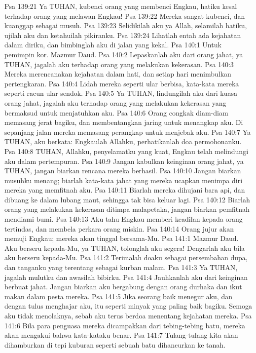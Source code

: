 Psa 139:21  Ya TUHAN, kubenci orang yang membenci Engkau, hatiku kesal terhadap orang yang melawan Engkau!
Psa 139:22  Mereka sangat kubenci, dan kuanggap sebagai musuh.
Psa 139:23  Selidikilah aku ya Allah, selamilah hatiku, ujilah aku dan ketahuilah pikiranku.
Psa 139:24  Lihatlah entah ada kejahatan dalam diriku, dan bimbinglah aku di jalan yang kekal.
Psa 140:1  Untuk pemimpin kor. Mazmur Daud.
Psa 140:2  Lepaskanlah aku dari orang jahat, ya TUHAN, jagalah aku terhadap orang yang melakukan kekerasan.
Psa 140:3  Mereka merencanakan kejahatan dalam hati, dan setiap hari menimbulkan pertengkaran.
Psa 140:4  Lidah mereka seperti ular berbisa, kata-kata mereka seperti racun ular sendok.
Psa 140:5  Ya TUHAN, lindungilah aku dari kuasa orang jahat, jagalah aku terhadap orang yang melakukan kekerasan yang bermaksud untuk menjatuhkan aku.
Psa 140:6  Orang congkak diam-diam memasang jerat bagiku, dan membentangkan jaring untuk menangkap aku. Di sepanjang jalan mereka memasang perangkap untuk menjebak aku.
Psa 140:7  Ya TUHAN, aku berkata: Engkaulah Allahku, perhatikanlah doa permohonanku.
Psa 140:8  TUHAN, Allahku, penyelamatku yang kuat, Engkau telah melindungi aku dalam pertempuran.
Psa 140:9  Jangan kabulkan keinginan orang jahat, ya TUHAN, jangan biarkan rencana mereka berhasil.
Psa 140:10  Jangan biarkan musuhku menang; biarlah kata-kata jahat yang mereka ucapkan menimpa diri mereka yang memfitnah aku.
Psa 140:11  Biarlah mereka dihujani bara api, dan dibuang ke dalam lubang maut, sehingga tak bisa keluar lagi.
Psa 140:12  Biarlah orang yang melakukan kekerasan ditimpa malapetaka, jangan biarkan pemfitnah mendiami bumi.
Psa 140:13  Aku tahu Engkau memberi keadilan kepada orang tertindas, dan membela perkara orang miskin.
Psa 140:14  Orang jujur akan memuji Engkau; mereka akan tinggal bersama-Mu.
Psa 141:1  Mazmur Daud. Aku berseru kepada-Mu, ya TUHAN, tolonglah aku segera! Dengarlah aku bila aku berseru kepada-Mu.
Psa 141:2  Terimalah doaku sebagai persembahan dupa, dan tanganku yang terentang sebagai kurban malam.
Psa 141:3  Ya TUHAN, jagalah mulutku dan awasilah bibirku.
Psa 141:4  Jauhkanlah aku dari keinginan berbuat jahat. Jangan biarkan aku bergabung dengan orang durhaka dan ikut makan dalam pesta mereka.
Psa 141:5  Jika seorang baik menegur aku, dan dengan tulus menghajar aku, itu seperti minyak yang paling baik bagiku. Semoga aku tidak menolaknya, sebab aku terus berdoa menentang kejahatan mereka.
Psa 141:6  Bila para penguasa mereka dicampakkan dari tebing-tebing batu, mereka akan mengakui bahwa kata-kataku benar.
Psa 141:7  Tulang-tulang kita akan dihamburkan di tepi kuburan seperti sebuah batu dihancurkan ke tanah.
